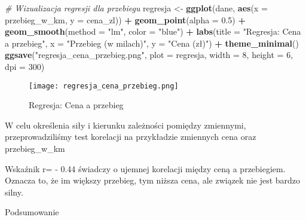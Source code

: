 \documentclass[
]{article}
\newenvironment{Shaded}{\begin{snugshade}}{\end{snugshade}}
\newcommand{\AttributeTok}[1]{\textcolor[rgb]{0.13,0.29,0.53}{#1}}
\newcommand{\CommentTok}[1]{\textcolor[rgb]{0.56,0.35,0.01}{\textit{#1}}}
\newcommand{\DecValTok}[1]{\textcolor[rgb]{0.00,0.00,0.81}{#1}}
\newcommand{\FloatTok}[1]{\textcolor[rgb]{0.00,0.00,0.81}{#1}}
\newcommand{\FunctionTok}[1]{\textcolor[rgb]{0.13,0.29,0.53}{\textbf{#1}}}
\newcommand{\NormalTok}[1]{#1}
\newcommand{\OtherTok}[1]{\textcolor[rgb]{0.56,0.35,0.01}{#1}}
\newcommand{\SpecialCharTok}[1]{\textcolor[rgb]{0.81,0.36,0.00}{\textbf{#1}}}
\newcommand{\StringTok}[1]{\textcolor[rgb]{0.31,0.60,0.02}{#1}}
\begin{document}
\begin{Shaded}
\begin{Highlighting}[]
\CommentTok{\# Wizualizacja regresji dla przebiegu}
\NormalTok{regresja }\OtherTok{\textless{}{-}} \FunctionTok{ggplot}\NormalTok{(dane, }\FunctionTok{aes}\NormalTok{(}\AttributeTok{x =}\NormalTok{ przebieg\_w\_km, }\AttributeTok{y =}\NormalTok{ cena\_zl)) }\SpecialCharTok{+}
  \FunctionTok{geom\_point}\NormalTok{(}\AttributeTok{alpha =} \FloatTok{0.5}\NormalTok{) }\SpecialCharTok{+}
  \FunctionTok{geom\_smooth}\NormalTok{(}\AttributeTok{method =} \StringTok{"lm"}\NormalTok{, }\AttributeTok{color =} \StringTok{"blue"}\NormalTok{) }\SpecialCharTok{+}
  \FunctionTok{labs}\NormalTok{(}\AttributeTok{title =} \StringTok{"Regresja: Cena a przebieg"}\NormalTok{, }\AttributeTok{x =} \StringTok{"Przebieg (w milach)"}\NormalTok{, }\AttributeTok{y =} \StringTok{"Cena (zł)"}\NormalTok{) }\SpecialCharTok{+}
  \FunctionTok{theme\_minimal}\NormalTok{()}
\FunctionTok{ggsave}\NormalTok{(}\StringTok{"regresja\_cena\_przebieg.png"}\NormalTok{, }\AttributeTok{plot =}\NormalTok{ regresja, }\AttributeTok{width =} \DecValTok{8}\NormalTok{, }\AttributeTok{height =} \DecValTok{6}\NormalTok{, }\AttributeTok{dpi =} \DecValTok{300}\NormalTok{)}
\end{Highlighting}
\end{Shaded}

\begin{figure}
\centering
\texttt{[image: regresja\_cena\_przebieg.png]}
\caption{Regresja: Cena a przebieg}
\end{figure}

W celu określenia siły i kierunku zależności pomiędzy zmiennymi,
przeprowadziliśmy test korelacji na przykładzie zmiennych cena oraz
przebieg\_w\_km

\begin{Shaded}
\end{Shaded}

Wskaźnik r= - 0.44 świadczy o ujemnej korelacji między ceną a
przebiegiem. Oznacza to, że im większy przebieg, tym niższa cena, ale
związek nie jest bardzo silny.

Podsumowanie
\end{document}
